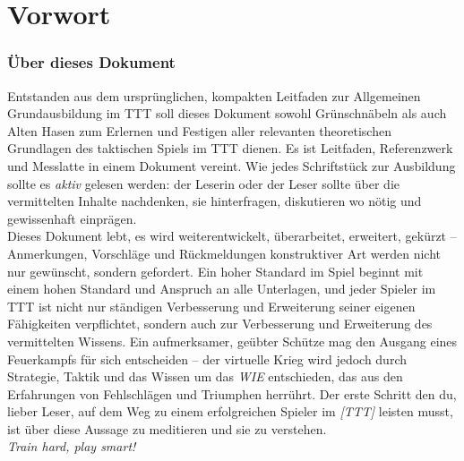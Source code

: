 \chapter*{Vorwort}
\subsection*{Über dieses Dokument}
Entstanden aus dem ursprünglichen, kompakten Leitfaden zur Allgemeinen Grundausbildung im \ac{TTT} soll dieses Dokument sowohl Grünschnäbeln als auch Alten Hasen zum Erlernen und Festigen aller relevanten theoretischen Grundlagen des taktischen Spiels im \ac{TTT} dienen. 
Es ist Leitfaden, Referenzwerk und Messlatte in einem Dokument vereint. 
Wie jedes Schriftstück zur Ausbildung sollte es \textit{aktiv} gelesen werden: der Leserin oder der Leser sollte über die vermittelten Inhalte nachdenken, sie hinterfragen, diskutieren wo nötig und gewissenhaft einprägen.\hfil\\
Dieses Dokument lebt, es wird weiterentwickelt, überarbeitet, erweitert, gekürzt -- Anmerkungen, Vorschläge und Rückmeldungen konstruktiver Art werden nicht nur gewünscht, sondern gefordert. Ein hoher Standard im Spiel beginnt mit einem hohen Standard und Anspruch an alle Unterlagen, und jeder Spieler im \ac{TTT} ist nicht nur ständigen Verbesserung und Erweiterung seiner eigenen Fähigkeiten verpflichtet, sondern auch zur Verbesserung und Erweiterung des vermittelten Wissens.
Ein aufmerksamer, geübter Schütze mag den Ausgang eines Feuerkampfs für sich entscheiden -- der virtuelle Krieg wird jedoch durch Strategie, Taktik und das Wissen um das \textit{WIE} entschieden, das aus den Erfahrungen von Fehlschlägen und Triumphen herrührt. Der erste Schritt den du, lieber Leser, auf dem Weg zu einem erfolgreichen Spieler im \emph{[\ac{TTT}]} leisten musst, ist über diese Aussage zu meditieren und sie zu verstehen.\\

\textit{Train hard, play smart!}

\newpage

